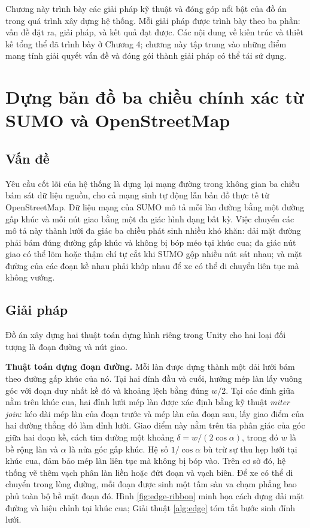 ﻿\documentclass[../DoAn.tex]{subfiles}
\begin{document}
Chương này trình bày các giải pháp kỹ thuật và đóng góp nổi bật của đồ án trong
quá trình xây dựng hệ thống. Mỗi giải pháp được trình bày theo ba phần: vấn đề
đặt ra, giải pháp, và kết quả đạt được. Các nội dung về kiến trúc và thiết kế
tổng thể đã trình bày ở Chương 4; chương này tập trung vào những điểm mang tính
giải quyết vấn đề và đóng gói thành giải pháp có thể tái sử dụng.

\section{Dựng bản đồ ba chiều chính xác từ SUMO và OpenStreetMap}
\label{sec:dung-ban-do}

\subsection{Vấn đề}

Yêu cầu cốt lõi của hệ thống là dựng lại mạng đường trong không gian ba chiều bám
sát dữ liệu nguồn, cho cả mạng sinh tự động lẫn bản đồ thực tế từ OpenStreetMap.
Dữ liệu mạng của \gls{SUMO} mô tả mỗi làn đường bằng một đường gấp khúc và mỗi
nút giao bằng một đa giác hình dạng bất kỳ. Việc chuyển các mô tả này thành lưới
đa giác ba chiều phát sinh nhiều khó khăn: dải mặt đường phải bám đúng đường gấp
khúc và không bị bóp méo tại khúc cua; đa giác nút giao có thể lõm hoặc thậm chí
tự cắt khi \gls{SUMO} gộp nhiều nút sát nhau; và mặt đường của các đoạn kề nhau
phải khớp nhau để xe có thể di chuyển liên tục mà không vướng.

\subsection{Giải pháp}

Đồ án xây dựng hai thuật toán dựng hình riêng trong Unity cho hai loại đối tượng
là đoạn đường và nút giao.

\textbf{Thuật toán dựng đoạn đường.} Mỗi làn được dựng thành một dải lưới bám theo
đường gấp khúc của nó. Tại hai đỉnh đầu và cuối, hướng mép làn lấy vuông góc với
đoạn duy nhất kề đó và khoảng lệch bằng đúng $w/2$. Tại các đỉnh giữa nằm trên khúc cua, hai đỉnh lưới
mép làn được xác định bằng kỹ thuật \emph{miter join}: kéo dài mép làn của đoạn
trước và mép làn của đoạn sau, lấy giao điểm của hai đường thẳng đó làm đỉnh lưới.
Giao điểm này nằm trên tia phân giác của góc giữa hai đoạn kề, cách tim đường một
khoảng $\delta = w/(2\cos\alpha)$, trong đó $w$ là bề rộng làn và $\alpha$ là nửa
góc gấp khúc. Hệ số $1/\cos\alpha$ bù trừ sự thu hẹp lưới tại khúc cua, đảm bảo mép làn
liên tục mà không bị bóp vào. Trên cơ sở đó, hệ thống vẽ thêm vạch phân làn liền hoặc đứt đoạn
và vạch biên. Để xe có thể di chuyển trong lòng đường, mỗi đoạn được sinh một tấm sàn va chạm
phẳng bao phủ toàn bộ bề mặt đoạn đó. Hình
\ref{fig:edge-ribbon} minh họa cách dựng dải mặt đường và hiệu chỉnh tại khúc cua;
Giải thuật \ref{alg:edge} tóm tắt bước sinh đỉnh lưới.
\end{document}
